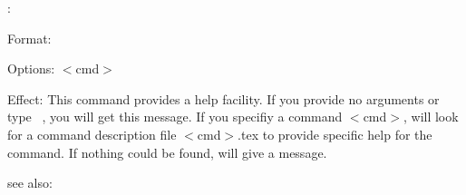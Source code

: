\colab{} \help:

Format: 

Options: $<$cmd$>$

Effect: This command provides a help facility. If you provide no
        arguments or type \help \ , you will get this message.
	If you specifiy a command $<$cmd$>$, \COLAB{} will look for a
	command description file $<$cmd$>$.tex to provide specific
	help for the command. If nothing could be found, \COLAB{} 
        will give a message.

see also: \?
